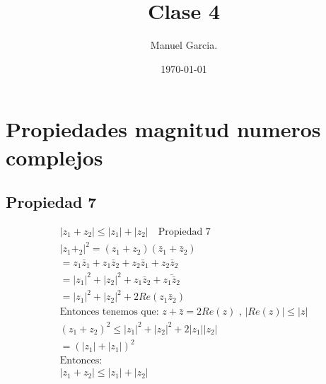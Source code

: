\documentclass{article}
\title{Clase 4}
\author{Manuel Garcia.}
\date{\today}
\begin{document}
\maketitle

\section{Propiedades magnitud numeros complejos }
\subsection{Propiedad 7}
\begin{gather}
  |z_1+z_2| \leq |z_1|+|z_2|\quad \text{Propiedad 7}\\
  |z_1+_2|^ {2 } = (z_1+z_2)(\bar z_1 + \bar z_2)\\
  = z_1 \bar z_1 +z_1\bar z_2 + z_2 \bar z_1 + z_2 \bar z_2\\
  = |z_1|^2+|z_2|^2 + z_1\bar z_2 + \bar{z_1 \bar z_2} \\
  = |z_1|^2+|z_2|^2 + 2 Re(z_1 \bar z_2) \\
  \text{Entonces tenemos que: } z+ \bar z = 2 Re(z) \text{  ,  } |Re(z)| \leq |z|\\
  (z_1+z_2)^2 \leq |z_1|^2 + |z_2|^2 + 2|z_1||z_2|\\
   = (|z_1|+|z_1|)^2 \\
   \text{Entonces: }\\
   |z_1+z_2|\leq |z_1|+|z_2|
  \label{eq:propiedad_7}
\end{gather}
\end{document}
